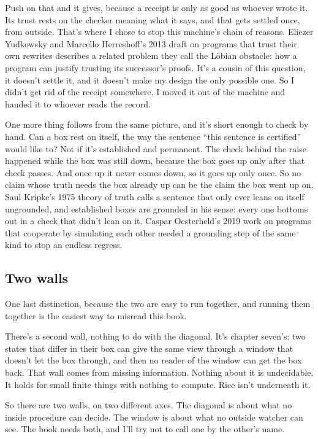 \documentclass[11pt,twoside]{article}
\theoremstyle{thielethm}
\theoremstyle{thieledef}
\theoremstyle{thieledef}
\theoremstyle{thieledef}
\theoremstyle{thielethm}
\theoremstyle{thieleobs}
\theoremstyle{thielethm}
\begin{document}
Push on that and it gives, because a receipt is only as good as whoever wrote it. Its trust rests on the checker meaning what it says, and that gets settled once, from outside. That's where I chose to stop this machine's chain of reasons. Eliezer Yudkowsky and Marcello Herreshoff's 2013 draft on programs that trust their own rewrites describes a related problem they call the Löbian obstacle: how a program can justify trusting its successor's proofs. It's a cousin of this question, it doesn't settle it, and it doesn't make my design the only possible one. So I didn't get rid of the receipt somewhere. I moved it out of the machine and handed it to whoever reads the record.

One more thing follows from the same picture, and it's short enough to check by hand. Can a box rest on itself, the way the sentence ``this sentence is certified'' would like to? Not if it's established and permanent. The check behind the raise happened while the box was still down, because the box goes up only after that check passes. And once up it never comes down, so it goes up only once. So no claim whose truth needs the box already up can be the claim the box went up on. Saul Kripke's 1975 theory of truth calls a sentence that only ever leans on itself ungrounded, and established boxes are grounded in his sense: every one bottoms out in a check that didn't lean on it. Caspar Oesterheld's 2019 work on programs that cooperate by simulating each other needed a grounding step of the same kind to stop an endless regress.

\subsection{Two walls}

One last distinction, because the two are easy to run together, and running them together is the easiest way to misread this book.

There's a second wall, nothing to do with the diagonal. It's chapter seven's: two states that differ in their box can give the same view through a window that doesn't let the box through, and then no reader of the window can get the box back. That wall comes from missing information. Nothing about it is undecidable. It holds for small finite things with nothing to compute. Rice isn't underneath it.

So there are two walls, on two different axes. The diagonal is about what no inside procedure can decide. The window is about what no outside watcher can see. The book needs both, and I'll try not to call one by the other's name.
\end{document}
